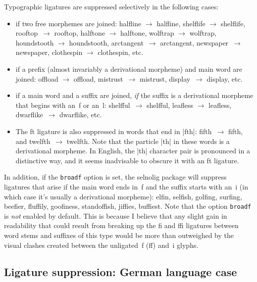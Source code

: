 \documentclass[11pt]{article}
\newcommand{\pkg}[1]{\textsf{#1}}
\newcommand{\opt}[1]{\texttt{#1}}
\begin{document}
Typographic ligatures are suppressed selectively in the following cases:
\begin{itemize}
\item if two free morphemes are joined: \mbox{halfline} $\to$ halfline, \mbox{shelflife} $\to$ shelflife, \mbox{rooftop}~$\to$ rooftop, \mbox{halftone} $\to$ halftone, \mbox{wolftrap} $\to$ wolftrap, \mbox{houndstooth} $\to$ houndstooth, \mbox{arctan}\-gent~$\to$ arctangent, \mbox{newspaper}~$\to$ newspaper, \mbox{clothespin} $\to$ clothespin, etc.

\item if a prefix (almost invariably a derivational morpheme) and main word are joined: \mbox{offload} $\to$ offload, mi\mbox{st}rust~$\to$ mistrust, di\mbox{sp}lay~$\to$ display, etc. 

\item if a main word and a suffix are joined, \emph{if} the suffix is a derivational morpheme that begins with an~f or an~l: \mbox{shelfful}~$\to$ shelfful, \mbox{leafless} $\to$ leafless, \mbox{dwarflike}~$\to$ dwarflike, etc. 

\item The ft ligature is also suppressed in words that end in |fth|: \mbox{fifth}~$\to$ fifth, and \mbox{twelfth}~$\to$ twelfth. Note that the particle |th| in these words is a derivational morpheme. In English, the |th| character pair is pronounced in a distinctive way, and it seems inadvisable to obscure it with an ft ligature.
\end{itemize}

In addition, if the \opt{broadf} option is set, the \pkg{selnolig} package will suppress ligatures that arise if the main word ends in~f and the suffix starts with an~i (in which case it's usually a derivational morpheme): elfin, selfish, golfing, surfing, beefier, fluffily, goofiness, standoffish, jiffies, buffiest. Note that the option \opt{broadf} is \emph{not} enabled by default. This is because I believe that any slight gain in readability that could result from breaking up the fi and ffi ligatures between word stems and suffixes of this type would be more than outweighed by the visual clashes created between the unligated~f (ff) and~i glyphs. 



\subsection{Ligature suppression: German language case}
\end{document}
